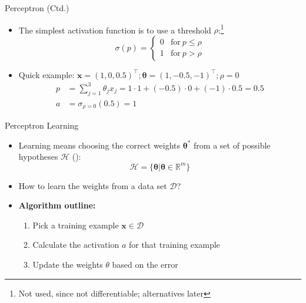 \begin{frame}{Perceptron (Ctd.)}{}
	\begin{itemize}
		\item The simplest activation function is to use a threshold $\rho$:\footnote[frame]{Not used, since not differentiable;
			alternatives later}
		\begin{equation*}
			\sigma(p) =
			\begin{cases}
				0 &	\text{for}\ p \le \rho \\
				1 & \text{for}\ p > \rho
			\end{cases}
		\end{equation*}
		\item Quick example: $\bm{x} = (1, 0, 0.5)^{\intercal}; \bm{\theta} = (1, -0.5, -1)^{\intercal}; \rho = 0$
		\begin{align*}
			p &= \sum_{j=1}^3 \theta_j x_j = 1 \cdot 1 + (-0.5) \cdot 0 + (-1) \cdot 0.5 = 0.5 \\
			a &= \sigma_{\rho=0}(0.5) = 1
		\end{align*}
	\end{itemize}
\end{frame}


\begin{frame}{Perceptron Learning}{}
	\begin{itemize}
		\item Learning means choosing the correct weights $\bm{\theta}^*$ from a set of possible hypotheses $\mathcal{H}$
		():
		\begin{equation*}
			\mathcal{H} = \{ \bm{\theta} \vert \bm{\theta} \in \mathbb{R}^m \}
		\end{equation*}
		\item How to learn the weights from a data set $\mathcal{D}$?
		\item \textbf{Algorithm outline:}
		\begin{enumerate}
			\item Pick a training example $\bm{x} \in \mathcal{D}$
			\item Calculate the activation $a$ for that training example
			\item Update the weights $\theta$ based on the error
		\end{enumerate}
	\end{itemize}
\end{frame}


